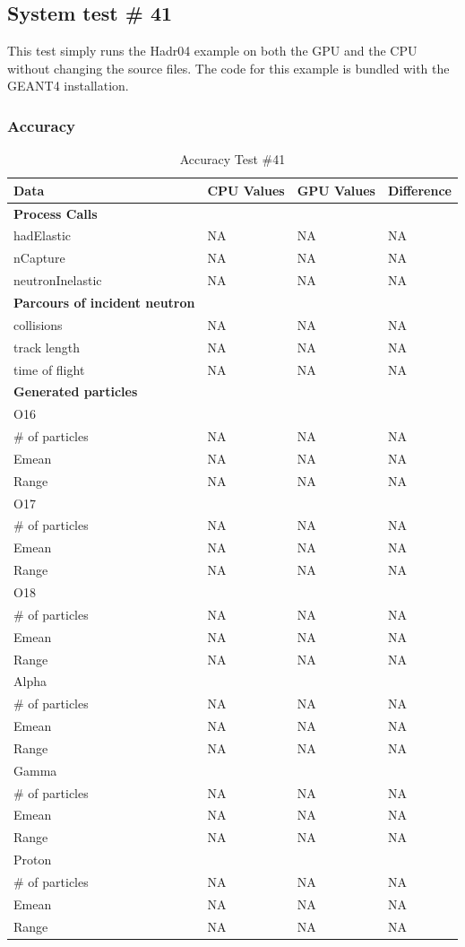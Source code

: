 \documentclass[12pt]{article}
\begin{document}
\subsection{System test \# 41}
This test simply runs the Hadr04 example on both the GPU and the CPU without changing the source files. The code for this example is bundled with the GEANT4 installation.\\
\break
	\subsubsection{Accuracy}
		\begin{table}[!htbp]
		\centering
		\caption{Accuracy Test \#41}\label{_acc}
		\begin{tabular}{llll}
		\toprule
		\bf Data & CPU Values & GPU Values & Difference\\\midrule
		\bf Process Calls&&&\\
		hadElastic&NA&NA&NA\\
		nCapture&NA&NA&NA\\
		neutronInelastic&NA&NA&NA\\ 
		\bf Parcours of incident neutron&&&\\
		collisions&NA&NA&NA\\
		track length&NA&NA&NA\\
		time of flight&NA&NA&NA\\
		\bf Generated particles&&&\\
		O16&&&\\
		\# of particles&NA&NA&NA\\
		Emean&NA&NA&NA\\
		Range&NA&NA&NA\\
		O17&&&\\
		\# of particles&NA&NA&NA\\
		Emean&NA&NA&NA\\
		Range&NA&NA&NA\\
		O18&&&\\
		\# of particles&NA&NA&NA\\
		Emean&NA&NA&NA\\
		Range&NA&NA&NA\\
		Alpha&&&\\
		\# of particles&NA&NA&NA\\
		Emean&NA&NA&NA\\
		Range&NA&NA&NA\\
		Gamma&&&\\
		\# of particles&NA&NA&NA\\
		Emean&NA&NA&NA\\
		Range&NA&NA&NA\\
		Proton&&&\\
		\# of particles&NA&NA&NA\\
		Emean&NA&NA&NA\\
		Range&NA&NA&NA\\
		\end{tabular}
		\end{table}
		\break
\end{document}
